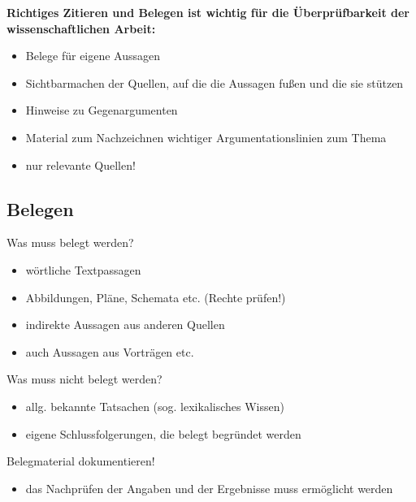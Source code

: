 \documentclass[ 12pt,
                titlepage,
                parskip=half,
                version=first,
                bibliography=totocnumbered,
                final,
                listof=totoc]{scrartcl}
\begin{document}
\textbf{Richtiges Zitieren und Belegen ist wichtig für die Überprüfbarkeit der
wissenschaftlichen Arbeit:}

\begin{itemize}
    \item Belege für eigene Aussagen
    \item Sichtbarmachen der Quellen, auf die die Aussagen fußen und die sie
    stützen
    \item Hinweise zu Gegenargumenten
    \item Material zum Nachzeichnen wichtiger Argumentationslinien zum Thema
    \item nur relevante Quellen!
\end{itemize}

\subsection{Belegen}
\label{sec:belegen}

\begin{description}
    \item[Was muss belegt werden?]
\end{description}
\begin{itemize}
    \item wörtliche Textpassagen
    \item Abbildungen, Pläne, Schemata etc. (Rechte prüfen!)
    \item indirekte Aussagen aus anderen Quellen
    \item auch Aussagen aus Vorträgen etc.
\end{itemize}

\begin{samepage}
\begin{description}
    \item[Was muss nicht belegt werden?]
\end{description}
\begin{itemize}
    \item allg. bekannte Tatsachen (sog. lexikalisches Wissen)
    \item eigene Schlussfolgerungen, die belegt begründet werden
\end{itemize}
\end{samepage}

\begin{description}
    \item[Belegmaterial dokumentieren!]
\end{description}
\begin{itemize}
    \item das Nachprüfen der Angaben und der Ergebnisse muss ermöglicht werden
\end{itemize}
\end{document}
